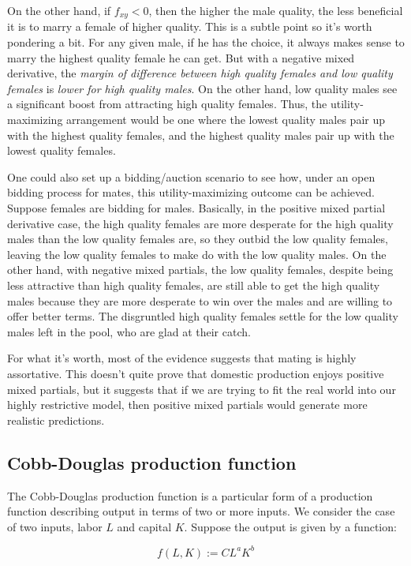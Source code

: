 \documentclass[10pt]{amsart}
\begin{document}
On the other hand, if $f_{xy} < 0$, then the higher the male quality,
the less beneficial it is to marry a female of higher quality. This is
a subtle point so it's worth pondering a bit. For any given male, if
he has the choice, it always makes sense to marry the highest quality
female he can get. But with a negative mixed derivative, the {\em
margin of difference between high quality females and low quality
females} is {\em lower for high quality males}. On the other hand, low
quality males see a significant boost from attracting high quality
females. Thus, the utility-maximizing arrangement would be one where
the lowest quality males pair up with the highest quality females, and
the highest quality males pair up with the lowest quality females.

One could also set up a bidding/auction scenario to see how, under an
open bidding process for mates, this utility-maximizing outcome can be
achieved. Suppose females are bidding for males. Basically, in the
positive mixed partial derivative case, the high quality females are
more desperate for the high quality males than the low quality females
are, so they outbid the low quality females, leaving the low quality
females to make do with the low quality males. On the other hand, with
negative mixed partials, the low quality females, despite being less
attractive than high quality females, are still able to get the high
quality males because they are more desperate to win over the males
and are willing to offer better terms. The disgruntled high quality
females settle for the low quality males left in the pool, who are
glad at their catch.

For what it's worth, most of the evidence suggests that mating is
highly assortative. This doesn't quite prove that domestic production
enjoys positive mixed partials, but it suggests that if we are trying
to fit the real world into our highly restrictive model, then positive
mixed partials would generate more realistic predictions.

\subsection{Cobb-Douglas production function}

The Cobb-Douglas production function is a particular form of a
production function describing output in terms of two or more
inputs. We consider the case of two inputs, labor $L$ and capital
$K$. Suppose the output is given by a function:

$$f(L,K) := CL^aK^b$$
\end{document}
